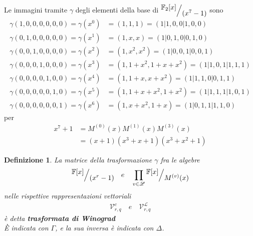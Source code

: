 \documentclass[mathserif]{beamer}
\def\quotient#1#2{%
   \raise1ex\hbox{$#1$}\Big/\lower1ex\hbox{$#2$}%
}
\newtheorem{definizione}{Definizione}
\begin{document}
\thispagestyle{empty}
\begin{frame}
   \vspace{-1.2cm}
    Le immagini tramite $\gamma$ degli elementi della base di $ \quotient{\mathbb{F}_{2} \lbrack x \rbrack  }{ (x^{7} - 1)}$ sono
    \begin{align*}
	\gamma(1,0,0,0,0,0,0)  = \gamma(x^0) &= (1,1,1) =  (1|1,0,0|1,0,0)          \\
	\gamma(0,1,0,0,0,0,0)  = \gamma(x^1) &= (1,x,x) = (1|0,1,0|0,1,0)            \\
	\gamma(0,0,1,0,0,0,0)  = \gamma(x^2) &= (1,x^2,x^2) = (1|0,0,1|0,0,1)        \\
	\gamma(0,0,0,1,0,0,0)  = \gamma(x^3) &= (1,1+x^2,1+x+x^2) = (1|1,0,1|1,1,1)  \\
	\gamma(0,0,0,0,1,0,0)  = \gamma(x^4) &= (1,1+x,x+x^2) = (1|1,1,0|0,1,1)      \\
	\gamma(0,0,0,0,0,1,0)  = \gamma(x^5) &= (1,1+x+x^2,1+x^2) = (1|1,1,1|1,0,1)  \\
	\gamma(0,0,0,0,0,0,1)  = \gamma(x^6) &= (1,x+x^2,1+x) = (1|0,1,1|1,1,0)
    \end{align*}
    per
    \begin{align*}
      x^{7} + 1 &= M^{(0)}(x) M^{(1)}(x) M^{(3)}(x) \\
		&= (x+1)(x^3 + x + 1)(x^3 + x^2 + 1)
    \end{align*}
\end{frame}


\begin{frame}
    \begin{definizione}
      La matrice della trasformazione $\gamma$ fra le algebre
      \begin{align*}
         \quotient{\mathbb{F} \lbrack x \rbrack  }{ (x^{r} - 1)}
         \quad
         e
         \quad
         \prod_{v\in \mathscr{L}} \quotient{\mathbb{F} \lbrack x \rbrack  }{M^{(v)}(x)}
      \end{align*}
      nelle rispettive rappresentazioni vettoriali
      \begin{align*}
         \mathcal{V}_{r, q}^{c} \quad e \quad \mathcal{V}_{r,q}^{\mathscr{L}}
      \end{align*}
      è detta {\bf trasformata di Winograd} \\
      È indicata con $\Gamma$, e la sua inversa è indicata con $\Delta$.
    \end{definizione}
\end{frame}
\end{document}
